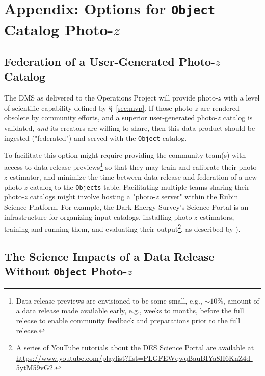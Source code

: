 \documentclass[DM,lsstdraft,toc]{lsstdoc}
\begin{document}
\clearpage
\section{Appendix: Options for {\tt Object} Catalog Photo-$z$}\label{sec:opts}

\subsection{Federation of a User-Generated Photo-$z$ Catalog}\label{ssec:opts_ugfed}

The DMS as delivered to the Operations Project will provide photo-$z$ with a level of scientific capability defined by  \S~\ref{sec:mvp}. 
If those photo-$z$ are rendered obsolete by community efforts, and a superior user-generated photo-$z$ catalog is validated, {\it and} its creators are willing to share, then this data product should be ingested ("federated") and served with the {\tt Object} catalog.

To facilitate this option might require providing the community team(s) with access to data release previews\footnote{Data release previews are envisioned to be some small, e.g., $\sim10\%$, amount of a data release made available early, e.g., weeks to months, before the full release to enable community feedback and preparations prior to the full release.} so that they may train and calibrate their photo-$z$ estimator, and minimize the time between data release and federation of a new photo-$z$ catalog to the {\tt Objects} table.
Facilitating multiple teams sharing their photo-$z$ catalogs might involve hosting a "photo-$z$ server" within the Rubin Science Platform.
For example, the Dark Energy Survey's Science Portal is an infrastructure for organizing input catalogs, installing photo-$z$ estimators, training and running them, and evaluating their output\footnote{A series of YouTube tutorials about the DES Science Portal are available at \url{https://www.youtube.com/playlist?list=PLGFEWqwqBauBIYa8H6KnZ4d-5ytM59vG2}.}, as described by \citet{2018A&C....25...58G}).

\subsection{The Science Impacts of a Data Release Without {\tt Object} Photo-$z$}\label{ssec:opts_none}
\end{document}
